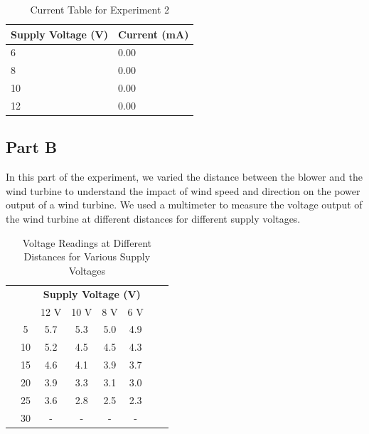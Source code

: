 \documentclass[a4paper, 12pt, english]{article}
\begin{document}
\begin{table}[H]
	\centering
	\caption{Current Table for Experiment 2}
	\label{tab:table2}
	\begin{tabular}{@{}ll@{}}
		\toprule
		\textbf{Supply Voltage (V)} & \textbf{Current (mA)} \\ \midrule
		6                           & 0.00                  \\
		8                           & 0.00                  \\
		10                          & 0.00                  \\
		12                          & 0.00                  \\ \bottomrule
	\end{tabular}
\end{table}

\subsection{Part B}
In this part of the experiment, we varied the distance between the blower and
the wind turbine to understand the impact of wind speed and direction on the
power output of a wind turbine. We used a multimeter to measure the voltage
output of the wind turbine at different distances for different supply
voltages.

\begin{table}[H]
	\centering
	\caption{Voltage Readings at Different Distances for Various Supply Voltages}
	\label{tab:table3}
	\begin{tabular}{@{}cccccccc@{}}
		\toprule
		 &    & \multicolumn{4}{c}{\textbf{Supply Voltage (V)}}                    \\ \cmidrule(l){3-6}
		 &    & 12 V                                            & 10 V & 8 V & 6 V \\ \midrule
		\multirow{6}{*}{\rotatebox[origin=c]{90}{\textbf{Distance (cm)}}}
		 & 5  & 5.7                                             & 5.3  & 5.0 & 4.9 \\
		 & 10 & 5.2                                             & 4.5  & 4.5 & 4.3 \\
		 & 15 & 4.6                                             & 4.1  & 3.9 & 3.7 \\
		 & 20 & 3.9                                             & 3.3  & 3.1 & 3.0 \\
		 & 25 & 3.6                                             & 2.8  & 2.5 & 2.3 \\
		 & 30 & -                                               & -    & -   & -   \\ \bottomrule
	\end{tabular}
\end{table}
\end{document}
